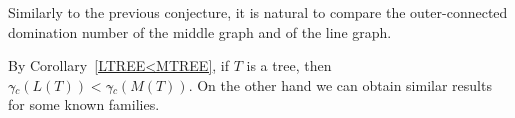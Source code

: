 \documentclass[a4paper,12pt, reqno]{amsart}
\newtheorem{Proposition}[Theorem]{Proposition}
\begin{document}
%
Similarly to the previous conjecture, it is natural to compare the outer-connected domination number of the middle graph and of the line graph.

By Corollary~\ref{LTREE<MTREE}, if $T$ is a tree, then $\gamma{\tilde{}} _{c}(L(T)) < \gamma{\tilde{}} _{c}(M(T))$. On the other hand we can obtain similar results for some known families.
\end{document}
